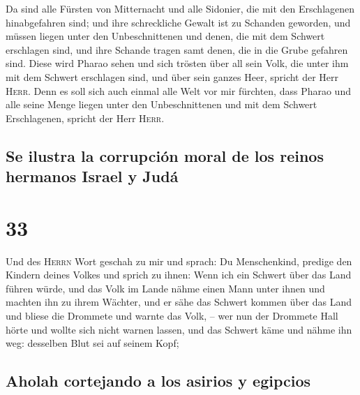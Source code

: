  Da sind alle Fürsten von Mitternacht und alle Sidonier,
die mit den Erschlagenen hinabgefahren sind; und ihre schreckliche
Gewalt ist zu Schanden geworden, und müssen liegen unter den
Unbeschnittenen und denen, die mit dem Schwert erschlagen sind, und ihre
Schande tragen samt denen, die in die Grube gefahren sind.
 Diese wird Pharao sehen und sich trösten über all sein
Volk, die unter ihm mit dem Schwert erschlagen sind, und über sein
ganzes Heer, spricht der Herr \textsc{Herr}.  Denn es
soll sich auch einmal alle Welt vor mir fürchten, dass Pharao und alle
seine Menge liegen unter den Unbeschnittenen und mit dem Schwert
Erschlagenen, spricht der Herr \textsc{Herr}.

\hypertarget{se-ilustra-la-corrupciuxf3n-moral-de-los-reinos-hermanos-israel-y-juduxe1}{%
\subsection{Se ilustra la corrupción moral de los reinos hermanos Israel
y
Judá}\label{se-ilustra-la-corrupciuxf3n-moral-de-los-reinos-hermanos-israel-y-juduxe1}}

\hypertarget{section-32}{%
\section{33}\label{section-32}}

 Und des \textsc{Herrn} Wort geschah zu mir und sprach:
 Du Menschenkind, predige den Kindern deines Volkes und
sprich zu ihnen: Wenn ich ein Schwert über das Land führen würde, und
das Volk im Lande nähme einen Mann unter ihnen und machten ihn zu ihrem
Wächter,  und er sähe das Schwert kommen über das Land und
bliese die Drommete und warnte das Volk, --  wer nun der
Drommete Hall hörte und wollte sich nicht warnen lassen, und das Schwert
käme und nähme ihn weg: desselben Blut sei auf seinem Kopf;

\hypertarget{aholah-cortejando-a-los-asirios-y-egipcios}{%
\subsection{Aholah cortejando a los asirios y
egipcios}\label{aholah-cortejando-a-los-asirios-y-egipcios}}

